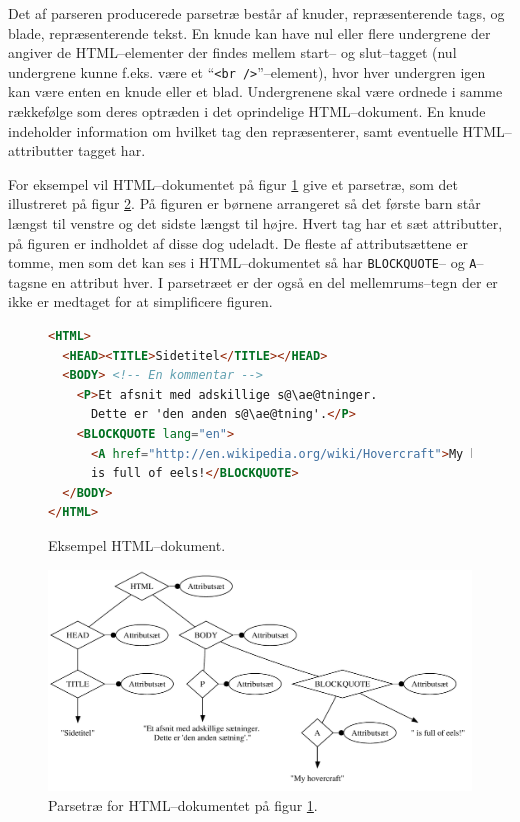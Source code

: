 \documentclass[a4paper,oneside]{memoir}
\begin{document}
Det af parseren producerede parsetræ består af knuder, repræsenterende
tags, og blade, repræsenterende tekst. En knude kan have nul eller
flere undergrene der angiver de HTML--elementer der findes mellem
start-- og slut--tagget (nul undergrene kunne f.eks. være et
``\texttt{<br />}''--element), hvor hver undergren igen kan være enten
en knude eller et blad. Undergrenene skal være ordnede i samme
rækkefølge som deres optræden i det oprindelige HTML--dokument. En
knude indeholder information om hvilket tag den repræsenterer, samt
eventuelle HTML--attributter tagget har.

For eksempel vil HTML--dokumentet på figur \ref{htmldoc1} give et
parsetræ, som det illustreret på figur \ref{parsetree}. På figuren er
børnene arrangeret så det første barn står længst til venstre og det
sidste længst til højre. Hvert tag har et sæt attributter, på figuren
er indholdet af disse dog udeladt. De fleste af attributsættene er
tomme, men som det kan ses i HTML--dokumentet så har
\texttt{BLOCKQUOTE}-- og \texttt{A}--tagsne en attribut hver.
I parsetræet er der også en del mellemrums--tegn der er ikke er
medtaget for at simplificere figuren.

\begin{figure}
\begin{lstlisting}[language=HTML,
                   escapechar=\@]
<HTML>
  <HEAD><TITLE>Sidetitel</TITLE></HEAD>
  <BODY> <!-- En kommentar -->
    <P>Et afsnit med adskillige s@\ae@tninger.
      Dette er 'den anden s@\ae@tning'.</P>
    <BLOCKQUOTE lang="en">
      <A href="http://en.wikipedia.org/wiki/Hovercraft">My hovercraft</A>
      is full of eels!</BLOCKQUOTE>
  </BODY>
</HTML>
\end{lstlisting}

  \caption{Eksempel HTML--dokument.}
  \label{htmldoc1}
\end{figure}

\begin{figure}
  \includegraphics[width=\textwidth]{parsetree.pdf}
  \caption{Parsetræ for HTML--dokumentet på figur \ref{htmldoc1}.}
  \label{parsetree}
\end{figure}
\end{document}
